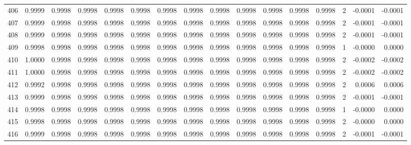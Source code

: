\begin{tabular}{lrrrrrrrrrrrrrrr}
406 &      0.9999 &  0.9998 &  0.9998 &  0.9998 &  0.9998 &  0.9998 &  0.9998 &  0.9998 &  0.9998 &  0.9998 &   0.9998 &     0.9998 &      2 &                   -0.0001 &                    -0.0001 \\
407 &      0.9999 &  0.9998 &  0.9998 &  0.9998 &  0.9998 &  0.9998 &  0.9998 &  0.9998 &  0.9998 &  0.9998 &   0.9998 &     0.9998 &      2 &                   -0.0001 &                    -0.0001 \\
408 &      0.9999 &  0.9998 &  0.9998 &  0.9998 &  0.9998 &  0.9998 &  0.9998 &  0.9998 &  0.9998 &  0.9998 &   0.9998 &     0.9998 &      2 &                   -0.0001 &                    -0.0001 \\
409 &      0.9998 &  0.9998 &  0.9998 &  0.9998 &  0.9998 &  0.9998 &  0.9998 &  0.9998 &  0.9998 &  0.9998 &   0.9998 &     0.9998 &      1 &                   -0.0000 &                     0.0000 \\
410 &      1.0000 &  0.9998 &  0.9998 &  0.9998 &  0.9998 &  0.9998 &  0.9998 &  0.9998 &  0.9998 &  0.9998 &   0.9998 &     0.9998 &      2 &                   -0.0002 &                    -0.0002 \\
411 &      1.0000 &  0.9998 &  0.9998 &  0.9998 &  0.9998 &  0.9998 &  0.9998 &  0.9998 &  0.9998 &  0.9998 &   0.9998 &     0.9998 &      2 &                   -0.0002 &                    -0.0002 \\
412 &      0.9992 &  0.9998 &  0.9998 &  0.9998 &  0.9998 &  0.9998 &  0.9998 &  0.9998 &  0.9998 &  0.9998 &   0.9998 &     0.9998 &      2 &                    0.0006 &                     0.0006 \\
413 &      0.9999 &  0.9998 &  0.9998 &  0.9998 &  0.9998 &  0.9998 &  0.9998 &  0.9998 &  0.9998 &  0.9998 &   0.9998 &     0.9998 &      2 &                   -0.0001 &                    -0.0001 \\
414 &      0.9998 &  0.9998 &  0.9998 &  0.9998 &  0.9998 &  0.9998 &  0.9998 &  0.9998 &  0.9998 &  0.9998 &   0.9998 &     0.9998 &      1 &                   -0.0000 &                     0.0000 \\
415 &      0.9998 &  0.9998 &  0.9998 &  0.9998 &  0.9998 &  0.9998 &  0.9998 &  0.9998 &  0.9998 &  0.9998 &   0.9998 &     0.9998 &      2 &                   -0.0000 &                     0.0000 \\
416 &      0.9999 &  0.9998 &  0.9998 &  0.9998 &  0.9998 &  0.9998 &  0.9998 &  0.9998 &  0.9998 &  0.9998 &   0.9998 &     0.9998 &      2 &                   -0.0001 &                    -0.0001 \\

\end{tabular}
